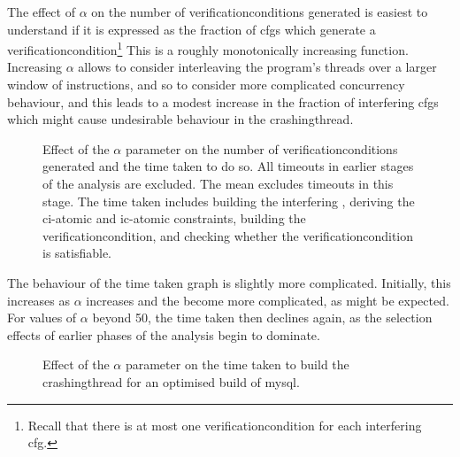 The effect of $\alpha$ on the number of \glspl{verificationcondition}
generated is easiest to understand if it is expressed as the fraction
of \glspl{cfg} which generate a
\gls{verificationcondition}\footnote{Recall that there is at most one
  \gls{verificationcondition} for each interfering \gls{cfg}.}  This
is a roughly monotonically increasing function.  Increasing $\alpha$
allows {\technique} to consider interleaving the program's threads
over a larger window of instructions, and so to consider more
complicated concurrency behaviour, and this leads to a modest increase
in the fraction of interfering \glspl{cfg} which might cause
undesirable behaviour in the \gls{crashingthread}.

\begin{figure}
  
  \caption{Effect of the $\alpha$ parameter on the number of
    \glspl{verificationcondition} generated and the time taken to do
    so.  All timeouts in earlier stages of the analysis are excluded.
    The mean excludes timeouts in this stage.  The time taken includes
    building the interfering {\StateMachine}, deriving the
    \gls{ci-atomic} and \gls{ic-atomic} constraints, building the
    \gls{verificationcondition}, and checking whether the
    \gls{verificationcondition} is satisfiable.}
  \label{fig:perf:alpha:gvc:unopt}
\end{figure}

The behaviour of the time taken graph is slightly more complicated.
Initially, this increases as $\alpha$ increases and the
{\StateMachines} become more complicated, as might be expected.  For
values of $\alpha$ beyond 50, the time taken then declines again, as
the selection effects of earlier phases of the analysis begin to
dominate.  


\begin{figure}
  
  \caption{Effect of the $\alpha$ parameter on the time taken to build
    the \gls{crashingthread} {\StateMachines} for an optimised build
    of mysql.}
  \label{fig:perf:alpha:bpm:opt}
\end{figure}

